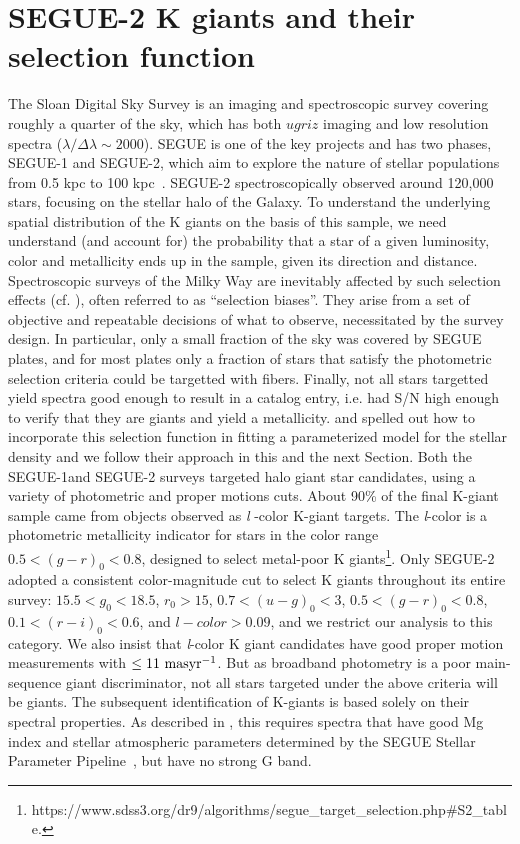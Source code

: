 \documentclass[12pt,preprint]{aastex}
\begin{document}
\section{SEGUE-2 K giants and their selection function}\label{sec:Sample_and_SelectionFunction}
The Sloan Digital Sky Survey\citep[SDSS;][]{York2000} is an imaging and spectroscopic survey covering roughly a quarter of the sky, which has both $ugriz$ imaging \citep{Fukugita1996, Gunn1998, Stoughton2002, Pier2003, Eisenstein2011} and low resolution spectra ($\lambda/\Delta \lambda \sim 2000$). SEGUE is one of
the key projects and has two phases, SEGUE-1 and SEGUE-2, which aim to explore the nature of stellar populations from 0.5 kpc to 100 kpc~\citep[][and Rockosi et al. in prep.]{Yanny2009b}. 
 SEGUE-2 spectroscopically observed around 120,000 stars, focusing on the stellar halo of the Galaxy.
To understand the underlying spatial distribution of the K giants on the basis of this sample, we need understand (and account for) the probability that a star of a given luminosity, color and metallicity ends up in the sample, given its direction and distance.
Spectroscopic surveys of the Milky Way are inevitably affected by such selection effects (cf. \citet{Rix2013}),
often referred to as ``selection biases''. They arise from a set of objective and repeatable decisions of what to observe,
necessitated by the survey design. In particular, only a small fraction of the sky was covered by SEGUE plates,
and for most plates only a fraction of stars that satisfy the photometric selection criteria could be targetted with fibers. Finally, not all stars targetted yield spectra good enough to result in a catalog entry, i.e. had S/N high enough to
verify that they are giants and yield a metallicity. \citet{Bovy2012} and \citet{Rix2013} spelled out how to incorporate this selection function in fitting a parameterized model for the stellar density and we follow their approach in this and the next Section.
Both the SEGUE-1and SEGUE-2 surveys targeted halo giant star candidates, using a variety of photometric and proper motions cuts. About 90\% of the final K-giant sample came from objects observed as \textit{l} -color K-giant targets.
The \textit{l}-color is a photometric metallicity indicator for stars in the color range $0.5 < (g-r)_0 < 0.8$, designed to select metal-poor K giants\footnote{https://www.sdss3.org/dr9/algorithms/segue\_target\_selection.php\#S2\_table.}.
Only SEGUE-2 adopted a consistent color-magnitude cut to select K giants throughout its entire survey: $15.5<g_0<18.5$, $r_0>15$, $0.7<(u-g)_0<3$, $0.5<(g-r)_0<0.8$, $0.1<(r-i)_0<0.6$, and $l-color>0.09$, and we restrict our analysis to this category. We also insist that \textit{l}-color K giant candidates have good proper motion measurements with $\le \rm 11~masyr^{-1}$.
But as broadband photometry is a poor main-sequence giant discriminator, not all stars targeted under the above criteria will be giants. The subsequent identification of K-giants is based solely on their spectral properties. As described in \citet{Xue2014}, this requires spectra that have good Mg index and stellar atmospheric parameters determined by the SEGUE Stellar Parameter Pipeline~\citep[SSPP;][]{Lee2008a,Lee2008b,Lee2011}, but have no strong G band.
\end{document}
